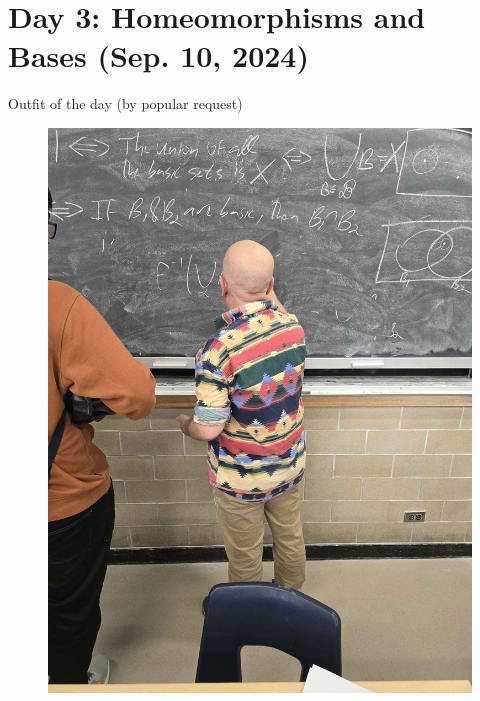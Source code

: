 \section{Day 3: Homeomorphisms and Bases (Sep. 10, 2024)}
Outfit of the day (by popular request)
\begin{figure}[h]
    \centering
    \includegraphics[scale=0.1]{MAT327 Notes/Dror Shirts/dror day 3 shirt.jpg}
\end{figure}

